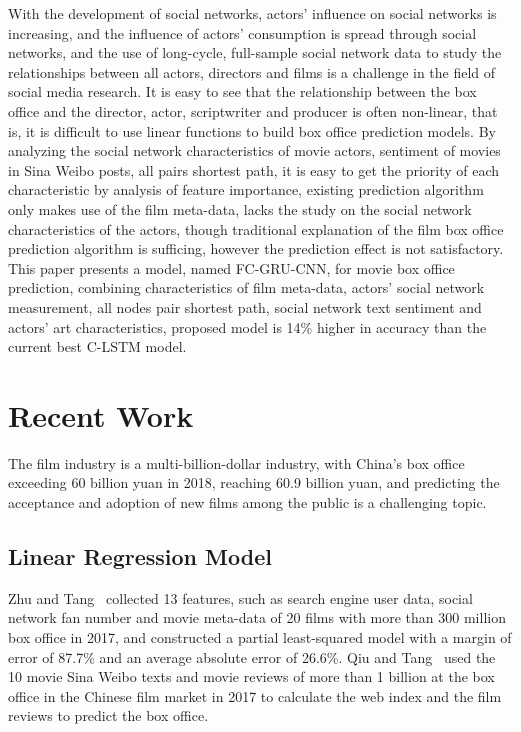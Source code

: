 \documentclass[review]{cvpr}
\begin{document}
With the development of social networks, actors' influence on social networks is increasing, and the influence of actors' consumption is spread through social networks, and the use of long-cycle, full-sample social network data to study the relationships between all actors, directors and films is a challenge in the field of social media research.
It is easy to see that the relationship between the box office and the director, actor, scriptwriter and producer is often non-linear, that is, it is difficult to use linear functions to build box office prediction models.
By analyzing the social network characteristics of movie actors, sentiment of movies in Sina Weibo posts, all pairs shortest path, it is easy to get the priority of each characteristic by analysis of feature importance, existing prediction algorithm only makes use of the film meta-data, lacks the study on the social network characteristics of the actors, though traditional explanation of the film box office prediction algorithm is sufficing, however the prediction effect is not satisfactory.
This paper presents a model, named FC-GRU-CNN, for movie box office prediction, combining characteristics of film meta-data, actors' social network measurement, all nodes pair shortest path, social network text sentiment and actors' art characteristics, proposed model is 14\% higher in accuracy than the current best C-LSTM model.


\section{Recent Work}

The film industry is a multi-billion-dollar industry, with China's box office exceeding 60 billion yuan in 2018, reaching 60.9 billion yuan, and predicting the acceptance and adoption of new films among the public is a challenging topic.

\subsection{Linear Regression Model}

Zhu and Tang~\cite{zhu2019film} collected 13 features, such as search engine user data, social network fan number and movie meta-data of 20 films with more than 300 million box office in 2017,
and constructed a partial least-squared model with a margin of error of 87.7\% and an average absolute error of 26.6\%.
Qiu and Tang~\cite{qiu2018microblog} used the 10 movie Sina Weibo texts and movie reviews of more than 1 billion at the box office in the Chinese film market in 2017 to calculate the web index and the film reviews to predict the box office.
\end{document}
